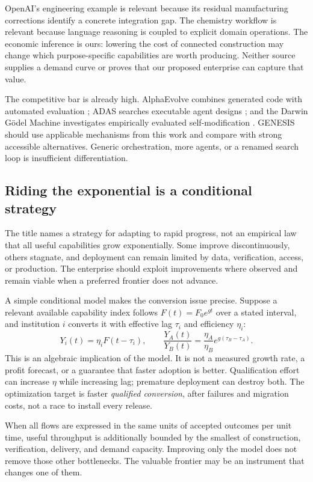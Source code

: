 \documentclass[11pt,letterpaper]{article}
\theoremstyle{remark}\newtheorem{remark}{Remark}[section]
\begin{document}
OpenAI's engineering example is relevant because its residual manufacturing corrections identify a concrete integration gap. The chemistry workflow is relevant because language reasoning is coupled to explicit domain operations. The economic inference is ours: lowering the cost of connected construction may change which purpose-specific capabilities are worth producing. Neither source supplies a demand curve or proves that our proposed enterprise can capture that value.

The competitive bar is already high. AlphaEvolve combines generated code with automated evaluation \citep{alphaevolve2025}; ADAS searches executable agent designs \citep{adas2024}; and the Darwin G\"odel Machine investigates empirically evaluated self-modification \citep{dgm2025}. GENESIS should use applicable mechanisms from this work and compare with strong accessible alternatives. Generic orchestration, more agents, or a renamed search loop is insufficient differentiation.

\subsection{Riding the exponential is a conditional strategy}
The title names a strategy for adapting to rapid progress, not an empirical law that all useful capabilities grow exponentially. Some improve discontinuously, others stagnate, and deployment can remain limited by data, verification, access, or production. The enterprise should exploit improvements where observed and remain viable when a preferred frontier does not advance.

A simple conditional model makes the conversion issue precise. Suppose a relevant available capability index follows $F(t)=F_0e^{gt}$ over a stated interval, and institution $i$ converts it with effective lag $\tau_i$ and efficiency $\eta_i$:
\begin{equation}
Y_i(t)=\eta_iF(t-\tau_i),\qquad
\frac{Y_A(t)}{Y_B(t)}=\frac{\eta_A}{\eta_B}e^{g(\tau_B-\tau_A)}.
\label{eq:lag}
\end{equation}
This is an algebraic implication of the model. It is not a measured growth rate, a profit forecast, or a guarantee that faster adoption is better. Qualification effort can increase $\eta$ while increasing lag; premature deployment can destroy both. The optimization target is faster \emph{qualified conversion}, after failures and migration costs, not a race to install every release.

When all flows are expressed in the same units of accepted outcomes per unit time, useful throughput is additionally bounded by the smallest of construction, verification, delivery, and demand capacity. Improving only the model does not remove those other bottlenecks. The valuable frontier may be an instrument that changes one of them.
\end{document}
